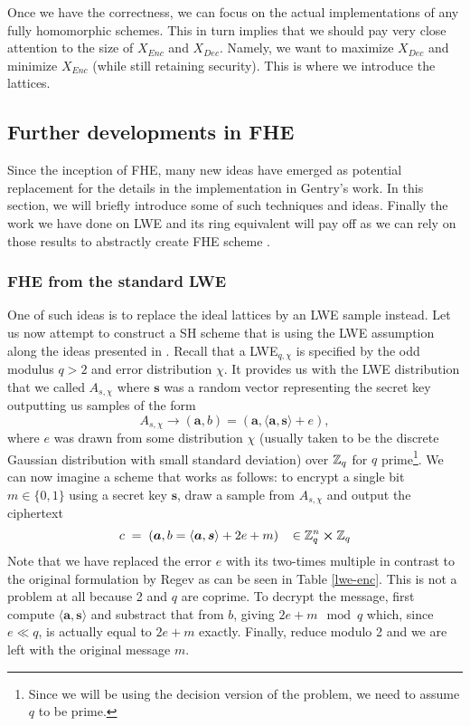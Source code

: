 Once we have the correctness, we can focus on the actual implementations of any fully homomorphic schemes. This in turn implies that we should pay very close attention to the size of $X_{Enc}$ and $X_{Dec}$. Namely, we want to maximize $X_{Dec}$ and minimize $X_{Enc}$ (while still retaining security). This is where we introduce the lattices.

\subsection{Further developments in FHE}
Since the inception of FHE, many new ideas have emerged as potential replacement for the details in the implementation in Gentry's work. In this section, we will briefly introduce some of such techniques and ideas. Finally the work we have done on LWE and its ring equivalent will pay off as we can rely on those results to abstractly create FHE scheme . 

\subsubsection{FHE from the standard LWE}
 One of such ideas is to replace the ideal lattices by an LWE sample instead. Let us now attempt to construct a SH scheme that is using the LWE assumption along the ideas presented in \cite{fhe-lwe}. Recall that a LWE$_{q, \chi}$ is specified by the odd modulus $q > 2$ and error distribution $\chi$. It provides us with the LWE distribution that we called $A_{s, \chi}$ where $\bm{s}$ was a random vector representing the secret key outputting us samples of the form
\[A_{s, \chi} \rightarrow (\bm{a}, b) = (\bm{a}, \langle \bm{a}, \bm{s} \rangle + e),\]
where $e$ was drawn from some distribution $\chi$ (usually taken to be the discrete Gaussian distribution with small standard deviation) over $\mathbb{Z}_q$ for $q$ prime\footnote{Since we will be using the decision version of the problem, we need to assume $q$ to be prime.}. We can now imagine a scheme that works as follows: to encrypt a single bit $m \in \{0,1\}$ using a secret key $\bm{s}$, draw a sample from $A_{s, \chi}$ and output the ciphertext
\[ c \; = \; (\boldsymbol{a}, b = \langle \boldsymbol{a}, \boldsymbol{s} \rangle +2e +m) \; \; \; \in \mathbb{Z}_q^n \cross \mathbb{Z}_q \]
Note that we have replaced the error $e$ with its two-times multiple in contrast to the original formulation by Regev as can be seen in Table \ref{lwe-enc}. This is not a problem at all because 2 and $q$ are coprime. To decrypt the message, first compute $\langle \bm{a},\bm{s} \rangle$ and substract that from $b$, giving $2e + m \mod q$ which, since $e \ll q$, is actually equal to $2e +m$ exactly. Finally, reduce modulo 2 and we are left with the original message $m$.

